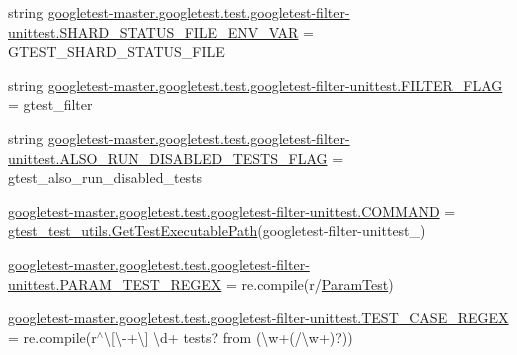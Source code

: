 \begin{DoxyCompactItemize}
\item 
string \mbox{\hyperlink{namespacegoogletest-master_1_1googletest_1_1test_1_1googletest-filter-unittest_a499e08a5a8cfbacc9c47c53f45a4ad51}{googletest-\/master.\+googletest.\+test.\+googletest-\/filter-\/unittest.\+S\+H\+A\+R\+D\+\_\+\+S\+T\+A\+T\+U\+S\+\_\+\+F\+I\+L\+E\+\_\+\+E\+N\+V\+\_\+\+V\+AR}} = \textquotesingle{}G\+T\+E\+S\+T\+\_\+\+S\+H\+A\+R\+D\+\_\+\+S\+T\+A\+T\+U\+S\+\_\+\+F\+I\+LE\textquotesingle{}
\item 
string \mbox{\hyperlink{namespacegoogletest-master_1_1googletest_1_1test_1_1googletest-filter-unittest_abb330fe7ab74db46643c00e74a359079}{googletest-\/master.\+googletest.\+test.\+googletest-\/filter-\/unittest.\+F\+I\+L\+T\+E\+R\+\_\+\+F\+L\+AG}} = \textquotesingle{}gtest\+\_\+filter\textquotesingle{}
\item 
string \mbox{\hyperlink{namespacegoogletest-master_1_1googletest_1_1test_1_1googletest-filter-unittest_a6bd12f84b7736a783a11d13a5d425980}{googletest-\/master.\+googletest.\+test.\+googletest-\/filter-\/unittest.\+A\+L\+S\+O\+\_\+\+R\+U\+N\+\_\+\+D\+I\+S\+A\+B\+L\+E\+D\+\_\+\+T\+E\+S\+T\+S\+\_\+\+F\+L\+AG}} = \textquotesingle{}gtest\+\_\+also\+\_\+run\+\_\+disabled\+\_\+tests\textquotesingle{}
\item 
\mbox{\hyperlink{namespacegoogletest-master_1_1googletest_1_1test_1_1googletest-filter-unittest_ac9558807dd67dd53c89cc7e34ebd1146}{googletest-\/master.\+googletest.\+test.\+googletest-\/filter-\/unittest.\+C\+O\+M\+M\+A\+ND}} = \mbox{\hyperlink{namespacegtest__test__utils_a89ed3717984a80ffbb7a9c92f71b86a2}{gtest\+\_\+test\+\_\+utils.\+Get\+Test\+Executable\+Path}}(\textquotesingle{}googletest-\/filter-\/unittest\+\_\+\textquotesingle{})
\item 
\mbox{\hyperlink{namespacegoogletest-master_1_1googletest_1_1test_1_1googletest-filter-unittest_a6db5eac02072ec2b17469418f03ab65b}{googletest-\/master.\+googletest.\+test.\+googletest-\/filter-\/unittest.\+P\+A\+R\+A\+M\+\_\+\+T\+E\+S\+T\+\_\+\+R\+E\+G\+EX}} = re.\+compile(r\textquotesingle{}/\mbox{\hyperlink{class_param_test}{Param\+Test}}\textquotesingle{})
\item 
\mbox{\hyperlink{namespacegoogletest-master_1_1googletest_1_1test_1_1googletest-filter-unittest_a15ee3c2dee9b441e40d77cda30faac51}{googletest-\/master.\+googletest.\+test.\+googletest-\/filter-\/unittest.\+T\+E\+S\+T\+\_\+\+C\+A\+S\+E\+\_\+\+R\+E\+G\+EX}} = re.\+compile(r\textquotesingle{}$^\wedge$\textbackslash{}\mbox{[}\textbackslash{}-\/+\textbackslash{}\mbox{]} \textbackslash{}d+ tests? from (\textbackslash{}w+(/\textbackslash{}w+)?)\textquotesingle{})

\end{DoxyCompactItemize}
